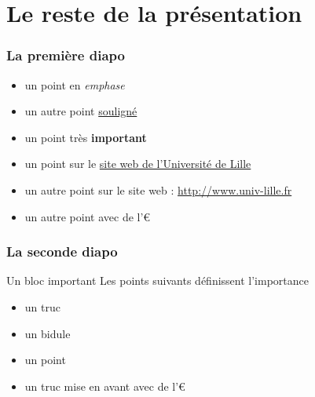 \documentclass[10pt,t]{beamer}
\begin{document}

\section{Le reste de la présentation}


\begin{frame}
  \frametitle{La première diapo}
  
  
  \begin{itemize}
  \item un point en \emph{emphase}
  \item un autre point \underline{souligné}
  \item un point très \textbf{important}
  \end{itemize} 
  
  \pause  
  
  
  \begin{itemize}
  \item un point sur le \href{http://www.univ-lille.fr}{site web de l'Université de Lille}
  \item un autre point sur le site web : \url{http://www.univ-lille.fr}
  \item un autre point avec de l'€
  \end{itemize} 
\end{frame}


\begin{frame}
  \frametitle{La seconde diapo}
  
  
  \begin{block}{Un bloc important}
    Les points suivants définissent l'importance
    \begin{itemize}
    \item un truc
    \item un bidule
    \end{itemize}
  \end{block}
  
  \pause  
  
  
  \begin{itemize}
  \item un point
  \item un truc mise en \alert{avant} avec de l'€
  \end{itemize} 
\end{frame}

\end{document}
